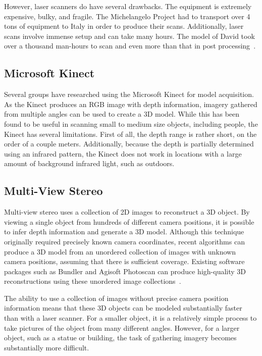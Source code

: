 However, laser scanners do have several drawbacks. The equipment is extremely expensive, bulky, and fragile. The Michelangelo Project had to transport over 4 tons of equipment to Italy in order to produce their scans. Additionally, laser scans involve immense setup and can take many hours. The model of David took over a thousand man-hours to scan and even more than that in post processing~\cite{Levoy}.

\subsection{Microsoft Kinect}

Several groups have researched using the Microsoft Kinect for model acquisition. As the Kinect produces an RGB image with depth information, imagery gathered from multiple angles can be used to create a 3D model. While this has been found to be useful in scanning small to medium size objects, including people, the Kinect has several limitations. First of all, the depth range is rather short, on the order of a couple meters. Additionally, because the depth is partially determined using an infrared pattern, the Kinect does not work in locations with a large amount of background infrared light, such as outdoors.

\subsection{Multi-View Stereo}
Multi-view stereo uses a collection of 2D images to reconstruct a 3D object. By viewing a single object from hundreds of different camera positions, it is possible to infer depth information and generate a 3D model. Although this technique originally required precisely known camera coordinates, recent algorithms can produce a 3D model from an unordered collection of images with unknown camera positions, assuming that there is sufficient coverage. Existing software packages such as Bundler and Agisoft Photoscan can produce high-quality 3D reconstructions using these unordered image collections~\cite{bundler, Agisoft}.

The ability to use a collection of images without precise camera position information means that these 3D objects can be modeled substantially faster than with a laser scanner. For a smaller object, it is a relatively simple process to take pictures of the object from many different angles. However, for a larger object, such as a statue or building, the task of gathering imagery becomes substantially more difficult.

